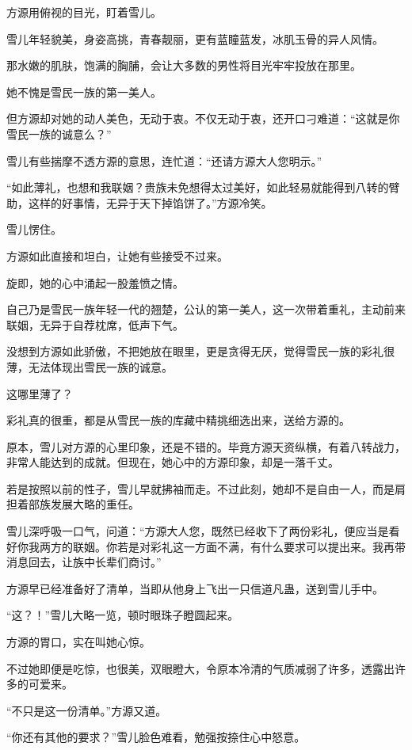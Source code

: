 
\begin{this_body}

方源用俯视的目光，盯着雪儿。

雪儿年轻貌美，身姿高挑，青春靓丽，更有蓝瞳蓝发，冰肌玉骨的异人风情。

那水嫩的肌肤，饱满的胸脯，会让大多数的男性将目光牢牢投放在那里。

她不愧是雪民一族的第一美人。

但方源却对她的动人美色，无动于衷。不仅无动于衷，还开口刁难道：“这就是你雪民一族的诚意么？”

雪儿有些揣摩不透方源的意思，连忙道：“还请方源大人您明示。”

“如此薄礼，也想和我联姻？贵族未免想得太过美好，如此轻易就能得到八转的臂助，这样的好事情，无异于天下掉馅饼了。”方源冷笑。

雪儿愣住。

方源如此直接和坦白，让她有些接受不过来。

旋即，她的心中涌起一股羞愤之情。

自己乃是雪民一族年轻一代的翘楚，公认的第一美人，这一次带着重礼，主动前来联姻，无异于自荐枕席，低声下气。

没想到方源如此骄傲，不把她放在眼里，更是贪得无厌，觉得雪民一族的彩礼很薄，无法体现出雪民一族的诚意。

这哪里薄了？

彩礼真的很重，都是从雪民一族的库藏中精挑细选出来，送给方源的。

原本，雪儿对方源的心里印象，还是不错的。毕竟方源天资纵横，有着八转战力，非常人能达到的成就。但现在，她心中的方源印象，却是一落千丈。

若是按照以前的性子，雪儿早就拂袖而走。不过此刻，她却不是自由一人，而是肩担着部族发展大略的重任。

雪儿深呼吸一口气，问道：“方源大人您，既然已经收下了两份彩礼，便应当是看好你我两方的联姻。你若是对彩礼这一方面不满，有什么要求可以提出来。我再带消息回去，让族中长辈们商讨。”

方源早已经准备好了清单，当即从他身上飞出一只信道凡蛊，送到雪儿手中。

“这？！”雪儿大略一览，顿时眼珠子瞪圆起来。

方源的胃口，实在叫她心惊。

不过她即便是吃惊，也很美，双眼瞪大，令原本冷清的气质减弱了许多，透露出许多的可爱来。

“不只是这一份清单。”方源又道。

“你还有其他的要求？”雪儿脸色难看，勉强按捺住心中怒意。


\end{this_body}
